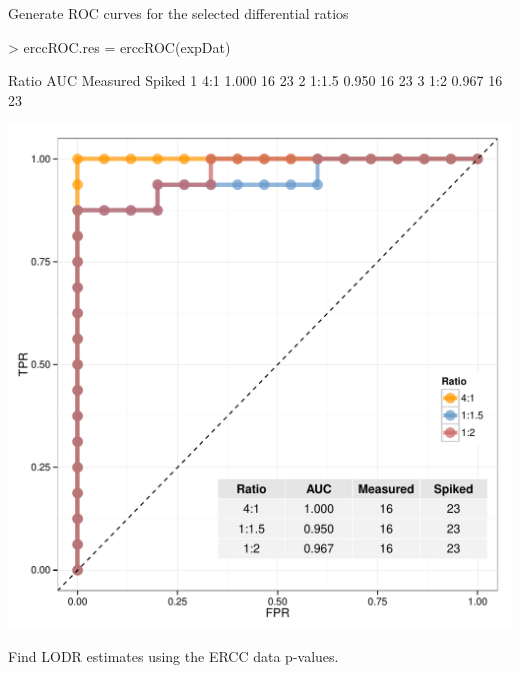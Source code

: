 \documentclass{article}
\begin{document}
Generate ROC curves for the selected differential ratios
\begin{center}
\begin{Schunk}
\begin{Sinput}
> erccROC.res = erccROC(expDat)
\end{Sinput}
\begin{Soutput}
  Ratio   AUC Measured Spiked
1   4:1 1.000       16     23
2 1:1.5 0.950       16     23
3   1:2 0.967       16     23
\end{Soutput}
\end{Schunk}
\includegraphics{erccdashboardVignette-erccROC}
\end{center}
Find LODR estimates using the ERCC data p-values.
\end{document}
